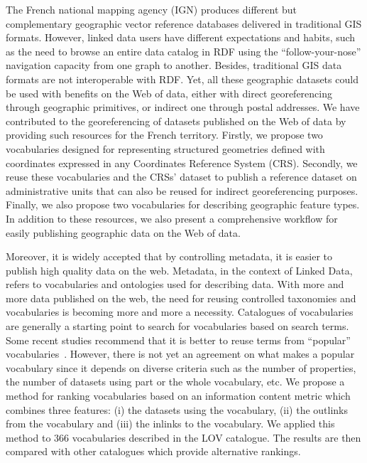
The French national mapping agency (IGN) produces different but complementary geographic vector reference databases delivered in traditional GIS formats. However, linked data users have different expectations and habits, such as the need to browse an entire data catalog in RDF using the ``follow-your-nose'' navigation capacity from one graph to another. Besides, traditional GIS data formats are not interoperable with RDF. Yet, all these geographic datasets could be used with benefits on the Web of data, either with direct georeferencing through geographic primitives, or indirect one through postal addresses.
We have contributed to the georeferencing of datasets published on the Web of data by providing such resources for the French territory. Firstly, we propose two vocabularies designed for representing structured geometries defined with coordinates expressed in any Coordinates Reference System (CRS). Secondly, we reuse these vocabularies and the CRSs' dataset to publish a reference dataset on administrative units that can also be reused for indirect georeferencing purposes. Finally, we also propose two vocabularies for describing geographic feature types. In addition to these resources, we also present a comprehensive workflow for easily publishing geographic data on the Web of data.

Moreover, it is widely accepted that by controlling metadata, it is easier to publish high quality data on the web. Metadata, in the context of Linked Data, refers to vocabularies and ontologies used for describing data. With more and more data published on the web, the need for reusing controlled taxonomies and vocabularies is becoming more and more a necessity. Catalogues of vocabularies are generally a starting point to search for vocabularies based on search terms. Some recent studies recommend that it is better to reuse terms from ``popular'' vocabularies~\cite{krzysztof14}. However, there is not yet an agreement on what makes a popular vocabulary since it depends on diverse criteria such as the number of properties, the number of datasets using part or the whole vocabulary, etc. We propose a method for ranking vocabularies based on an information content metric which combines three features: (i) the datasets using the vocabulary, (ii) the outlinks from the vocabulary and (iii) the inlinks to the vocabulary. We applied this method to $366$ vocabularies described in the LOV catalogue. The results are then compared with other catalogues which provide alternative rankings.

